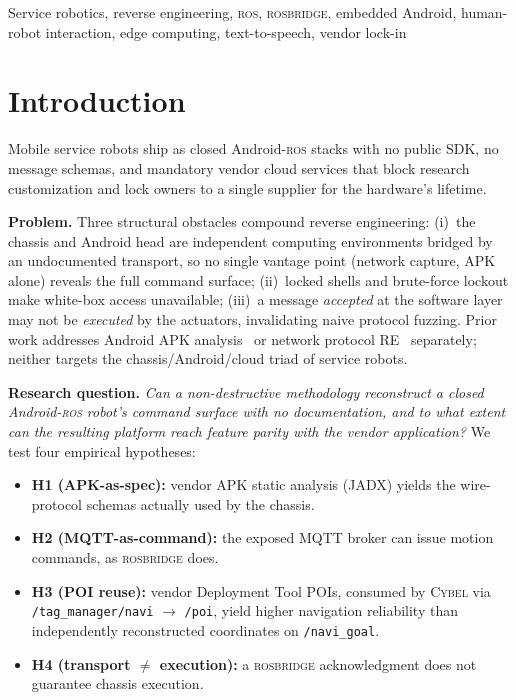 \documentclass[conference]{IEEEtran}
\newcommand{\ros}{\textsc{ros}}
\newcommand{\rosbridge}{\textsc{rosbridge}}
\newcommand{\cybel}{\textsc{Cybel}}
\begin{document}
\begin{IEEEkeywords}
Service robotics, reverse engineering, \ros{}, \rosbridge{}, embedded Android, human-robot interaction, edge computing, text-to-speech, vendor lock-in
\end{IEEEkeywords}

\section{Introduction}

Mobile service robots ship as closed Android-\ros{} stacks with no public SDK, no message schemas, and mandatory vendor cloud services that block research customization and lock owners to a single supplier for the hardware's lifetime.

\textbf{Problem.} Three structural obstacles compound reverse engineering: (i)~the chassis and Android head are independent computing environments bridged by an undocumented transport, so no single vantage point (network capture, APK alone) reveals the full command surface; (ii)~locked shells and brute-force lockout make white-box access unavailable; (iii)~a message \emph{accepted} at the software layer may not be \emph{executed} by the actuators, invalidating naive protocol fuzzing.
Prior work addresses Android APK analysis~\cite{enck2014taintdroid} or network protocol RE~\cite{comparetti2009prospex} separately; neither targets the chassis/Android/cloud triad of service robots.

\textbf{Research question.} \emph{Can a non-destructive methodology reconstruct a closed Android-\ros{} robot's command surface with no documentation, and to what extent can the resulting platform reach feature parity with the vendor application?}
We test four empirical hypotheses:

\begin{itemize}[leftmargin=1.3em]
\item \textbf{H1 (APK-as-spec):} vendor APK static analysis (JADX) yields the wire-protocol schemas actually used by the chassis.
\item \textbf{H2 (MQTT-as-command):} the exposed MQTT broker can issue motion commands, as \rosbridge{} does.
\item \textbf{H3 (POI reuse):} vendor Deployment Tool POIs, consumed by \cybel{} via \texttt{/tag\_manager/navi} $\rightarrow$ \texttt{/poi}, yield higher navigation reliability than independently reconstructed coordinates on \texttt{/navi\_goal}.
\item \textbf{H4 (transport $\neq$ execution):} a \rosbridge{} acknowledgment does not guarantee chassis execution.
\end{itemize}
\end{document}
